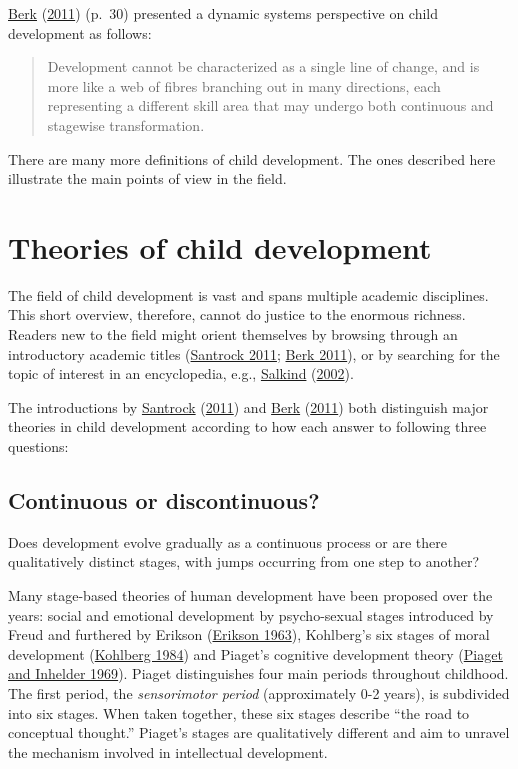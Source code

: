 \documentclass[
]{book}
\begin{document}
\protect\hyperlink{ref-berk2013}{Berk} (\protect\hyperlink{ref-berk2013}{2011}) (p.~30) presented a dynamic systems perspective on child development as follows:

\begin{quote}
Development cannot be characterized as a single line of change, and is more like a web of fibres branching out in many directions, each representing a different skill area that may undergo both continuous and stagewise transformation.
\end{quote}

There are many more definitions of child development. The ones described here illustrate the main points of view in the field.

\hypertarget{sec:theories}{%
\section{Theories of child development}\label{sec:theories}}

The field of child development is vast and spans multiple academic disciplines. This short overview, therefore, cannot do justice to the enormous richness. Readers new to the field might orient themselves by browsing through an introductory academic titles (\protect\hyperlink{ref-santrock2010}{Santrock 2011}; \protect\hyperlink{ref-berk2013}{Berk 2011}), or by searching for the topic of interest in an encyclopedia, e.g., \protect\hyperlink{ref-salkind2002}{Salkind} (\protect\hyperlink{ref-salkind2002}{2002}).

The introductions by \protect\hyperlink{ref-santrock2010}{Santrock} (\protect\hyperlink{ref-santrock2010}{2011}) and \protect\hyperlink{ref-berk2013}{Berk} (\protect\hyperlink{ref-berk2013}{2011}) both distinguish major theories in child development according to how each answer to following three questions:

\hypertarget{continuous-or-discontinuous}{%
\subsection{Continuous or discontinuous?}\label{continuous-or-discontinuous}}

Does development evolve gradually as a continuous process or are there qualitatively distinct stages, with jumps occurring from one step to another?

Many stage-based theories of human development have been proposed over the years: social and emotional development by psycho-sexual stages introduced by Freud and furthered by Erikson (\protect\hyperlink{ref-erikson1963}{Erikson 1963}), Kohlberg's six stages of moral development (\protect\hyperlink{ref-kohlberg1984}{Kohlberg 1984}) and Piaget's cognitive development theory (\protect\hyperlink{ref-piaget1969}{Piaget and Inhelder 1969}). Piaget distinguishes four main periods throughout childhood. The first period, the \emph{sensorimotor period} (approximately 0-2 years), is subdivided into six stages. When taken together, these six stages describe ``the road to conceptual thought.'' Piaget's stages are qualitatively different and aim to unravel the mechanism involved in intellectual development.
\end{document}
